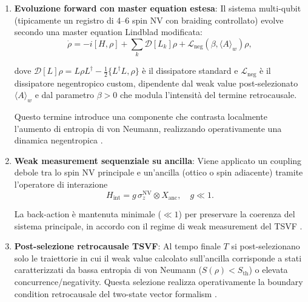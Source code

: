 \documentclass[11pt,a4paper]{article}
\let\oldcite\cite
\renewcommand{\cite}{\protect\oldcite}
\theoremstyle{plain}
\theoremstyle{definition}
\begin{document}
\begin{enumerate}
    \item \textbf{Evoluzione forward con master equation estesa}: Il sistema multi-qubit (tipicamente un registro di 4--6 spin NV con braiding controllato) evolve secondo una master equation Lindblad modificata:
    \begin{equation}
    \dot{\rho} = -i[H,\rho] + \sum_k \mathcal{D}[L_k]\rho + \mathcal{L}_{\text{neg}}(\beta,\langle A \rangle_w)\rho,
    \label{eq:master_neg}
    \end{equation}

    
    dove \(\mathcal{D}[L]\rho = L\rho L^\dagger - \frac{1}{2}\{L^\dagger L, \rho\}\) è il dissipatore standard e \(\mathcal{L}_{\text{neg}}\) è il dissipatore negentropico custom, dipendente dal weak value post-selezionato \(\langle A \rangle_w\) e dal parametro \(\beta > 0\) che modula l'intensità del termine retrocausale. 
    
    
 \clearpage 
    
    Questo termine introduce una componente che contrasta localmente l'aumento di entropia di von Neumann, realizzando operativamente una dinamica negentropica \cite{aharonov2007,vaidman2007}.


    \vspace{0.2cm}

    \item \textbf{Weak measurement sequenziale su ancilla}: Viene applicato un coupling debole tra lo spin NV principale e un'ancilla (ottico o spin adiacente) tramite l'operatore di interazione
    \begin{equation}
    H_{\text{int}} = g \, \sigma_z^{\text{NV}} \otimes X_{\text{anc}}, \quad g \ll 1.
    \label{eq:weak_coupling}
    \end{equation}


    \vspace{0.2cm}
    La back-action è mantenuta minimale (\(\ll 1\)) per preservare la coerenza del sistema principale, in accordo con il regime di weak measurement del TSVF \cite{aharonov2007}.


    \vspace{0.3cm}

    \item \textbf{Post-selezione retrocausale TSVF}: Al tempo finale \(T\) si post-selezionano solo le traiettorie in cui il weak value calcolato sull'ancilla corrisponde a stati caratterizzati da bassa entropia di von Neumann (\(S(\rho) < S_{\text{th}}\)) o elevata concurrence/negativity. Questa selezione realizza operativamente la boundary condition retrocausale del two-state vector formalism \cite{vaidman2007,aharonov2014}.


\end{enumerate}
\end{document}
